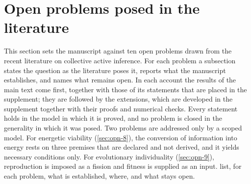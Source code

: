 \section{Open problems posed in the literature}\label{sec:opn}

This section sets the manuscript against ten open problems drawn from the recent literature on collective active inference. For each problem a subsection states the question as the literature poses it, reports what the manuscript establishes, and names what remains open. In each account the results of the main text come first, together with those of its statements that are placed in the supplement; they are followed by the extensions, which are developed in the supplement together with their proofs and numerical checks. Every statement holds in the model in which it is proved, and no problem is closed in the generality in which it was posed. Two problems are addressed only by a scoped model. For energetic viability (\cref{sec:opn-8}), the conversion of information into energy rests on three premises that are declared and not derived, and it yields necessary conditions only. For evolutionary individuality (\cref{sec:opn-9}), reproduction is imposed as a fission and fitness is supplied as an input.  list, for each problem, what is established, where, and what stays open.

